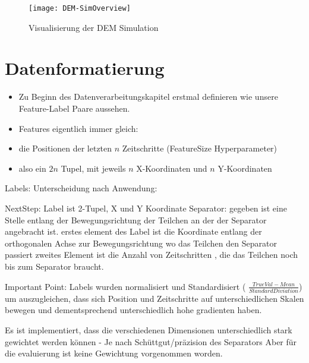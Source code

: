 
\begin{figure}[h]
    \centering
	\texttt{[image: DEM-SimOverview]}
	\caption{Visualisierung der DEM Simulation~\cite{Pfaff2018}}
	\label{fig:DEMSimulation}
\end{figure}



\section{Datenformatierung}

\color{blue}
\begin{itemize}
	\item Zu Beginn des Datenverarbeitungskapitel erstmal definieren wie unsere Feature-Label Paare aussehen.
	\item Features eigentlich immer gleich:
	\item die Positionen der letzten \(n\) Zeitschritte (FeatureSize Hyperparameter)
	\item also ein \(2n\) Tupel, mit jeweils \(n\) X-Koordinaten und \(n\) Y-Koordinaten
\end{itemize}

Labels: Unterscheidung nach Anwendung:

NextStep: Label ist 2-Tupel, X und Y Koordinate
Separator: 
	gegeben ist eine Stelle entlang der Bewegungsrichtung der Teilchen an der der Separator angebracht ist.
	erstes element des Label ist die Koordinate entlang der orthogonalen Achse zur Bewegungsrichtung wo das Teilchen den Separator passiert
	zweites Element ist die Anzahl von Zeitschritten , die das Teilchen noch bis zum Separator braucht.

Important Point: Labels wurden normalisiert und Standardisiert ( \(\frac{TrueVal - Mean}{Standard Diviation}\))
um auszugleichen, dass sich Position und Zeitschritte auf unterschiedlichen Skalen bewegen und dementsprechend unterschiedlich hohe gradienten haben.


Es ist implementiert, dass die verschiedenen Dimensionen unterschiedlich stark gewichtet werden können - Je nach Schüttgut/präzision des Separators
Aber für die evaluierung ist keine Gewichtung vorgenommen worden.

